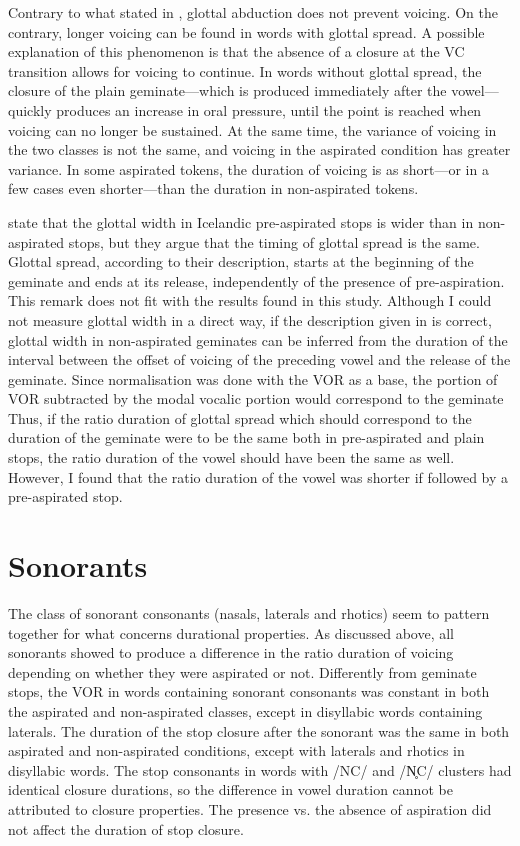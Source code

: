 \documentclass[11pt,a4paper,openany]{memoir}\usepackage[]{graphicx}\usepackage[]{color}
\begin{document}
Contrary to what stated in , glottal abduction does not prevent voicing.
On the contrary, longer voicing can be found in words with glottal spread.
A possible explanation of this phenomenon is that the absence of a closure at the VC transition allows for voicing to continue.
In words without glottal spread, the closure of the plain geminate---which is produced immediately after the vowel---quickly produces an increase in oral pressure, until the point is reached when voicing can no longer be sustained.
At the same time, the variance of voicing in the two classes is not the same, and voicing in the aspirated condition has greater variance.
In some aspirated tokens, the duration of voicing is as short---or in a few cases even shorter---than the duration in non-aspirated tokens.

\citet[70--71]{ladefoged1996} state that the glottal width in Icelandic pre-aspirated stops is wider than in non-aspirated stops, but they argue that the timing of glottal spread is the same.
Glottal spread, according to their description, starts at the beginning of the geminate and ends at its release, independently of the presence of pre-aspiration. 
This remark does not fit with the results found in this study.
Although I could not measure glottal width in a direct way, if the description given in \citet{ladefoged1996} is correct, glottal width in non-aspirated geminates can be inferred from the duration of the interval between the offset of voicing of the preceding vowel and the release of the geminate.
Since normalisation was done with the VOR as a base, the portion of VOR subtracted by the modal vocalic portion would correspond to the geminate
Thus, if the ratio duration of glottal spread which should correspond to the duration of the geminate were to be the same both in pre-aspirated and plain stops, the ratio duration of the vowel should have been the same as well.
However, I found that the ratio duration of the vowel was shorter if followed by a pre-aspirated stop.

\section{Sonorants}

The class of sonorant consonants (nasals, laterals and rhotics) seem to pattern together for what concerns durational properties.
As discussed above, all sonorants showed to produce a difference in the ratio duration of voicing depending on whether they were aspirated or not.
Differently from geminate stops, the VOR in words containing sonorant consonants was constant in both the aspirated and non-aspirated classes, except in disyllabic words containing laterals.
The duration of the stop closure after the sonorant was the same in both aspirated and non-aspirated conditions, except with laterals and rhotics in disyllabic words.
The stop consonants in words with /NC/ and /N̥C/ clusters had identical closure durations, so the difference in vowel duration cannot be attributed to closure properties.
The presence vs. the absence of aspiration did not affect the duration of stop closure.
\end{document}
